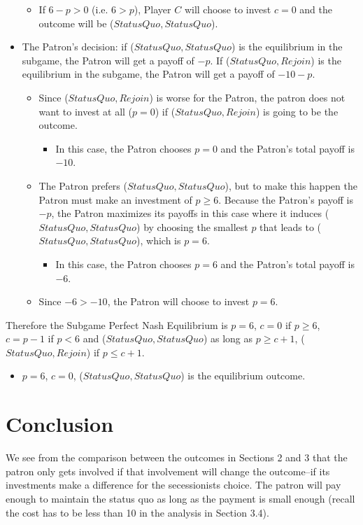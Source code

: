 \documentclass[12pt]{article}
\begin{document}
\begin{itemize}
\begin{itemize}
			\item If $6 - p > 0$ (i.e. $6 > p$), Player $C$ will choose to invest $c = 0$ and the outcome will be ($Status Quo,Status Quo$).
		\end{itemize}
	\item The Patron's decision: if ($Status Quo,Status Quo$) is the equilibrium in the subgame, the Patron will get a payoff of $-p$. If ($Status Quo,Rejoin$) is the equilibrium in the subgame, the Patron will get a payoff of $-10-p$.
		\begin{itemize}
			\item Since ($Status Quo,Rejoin$) is worse for the Patron, the patron does not want to invest at all ($p=0$) if ($Status Quo,Rejoin$) is going to be the outcome. 
				\begin{itemize}
					\item In this case, the Patron chooses $p=0$ and the Patron's total payoff is $-10$.
				\end{itemize}
			\item The Patron prefers ($Status Quo,Status Quo$), but to make this happen the Patron must make an investment of $p \geq 6$. Because the Patron's payoff is $-p$, the Patron maximizes its payoffs in this case where it induces ($Status Quo,Status Quo$) by choosing the smallest $p$ that leads to ($Status Quo,Status Quo$), which is $p=6$. 
				\begin{itemize}
					\item In this case, the Patron chooses $p=6$ and the Patron's total payoff is $-6$.
				\end{itemize}
			\item Since $-6 > -10$, the Patron will choose to invest $p=6$.
		\end{itemize}
\end{itemize}
Therefore the Subgame Perfect Nash Equilibrium is $p=6$, $c = 0$ if $p \geq 6$, $c = p-1$ if $p < 6$ and ($Status Quo,Status Quo$) as long as $p \geq c+1$, ($Status Quo,Rejoin$) if $p \leq c+ 1$.
\begin{itemize}
	\item $p=6$, $c = 0$, ($Status Quo,Status Quo$) is the equilibrium outcome.
\end{itemize}

\section{Conclusion}
We see from the comparison between the outcomes in Sections 2 and 3 that the patron only gets involved if that involvement will change the outcome--if its investments make a difference for the secessionists choice. The patron will pay enough to maintain the status quo as long as the payment is small enough (recall the cost has to be less than 10 in the analysis in Section 3.4). \\
\end{document}
